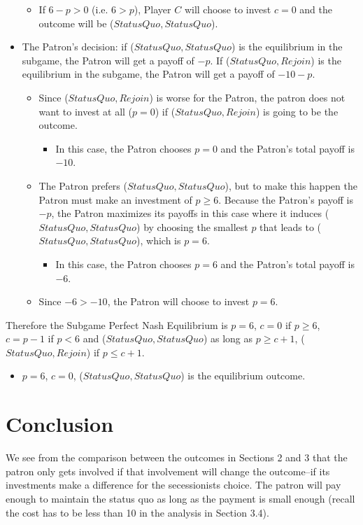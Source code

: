 \documentclass[12pt]{article}
\begin{document}
\begin{itemize}
\begin{itemize}
			\item If $6 - p > 0$ (i.e. $6 > p$), Player $C$ will choose to invest $c = 0$ and the outcome will be ($Status Quo,Status Quo$).
		\end{itemize}
	\item The Patron's decision: if ($Status Quo,Status Quo$) is the equilibrium in the subgame, the Patron will get a payoff of $-p$. If ($Status Quo,Rejoin$) is the equilibrium in the subgame, the Patron will get a payoff of $-10-p$.
		\begin{itemize}
			\item Since ($Status Quo,Rejoin$) is worse for the Patron, the patron does not want to invest at all ($p=0$) if ($Status Quo,Rejoin$) is going to be the outcome. 
				\begin{itemize}
					\item In this case, the Patron chooses $p=0$ and the Patron's total payoff is $-10$.
				\end{itemize}
			\item The Patron prefers ($Status Quo,Status Quo$), but to make this happen the Patron must make an investment of $p \geq 6$. Because the Patron's payoff is $-p$, the Patron maximizes its payoffs in this case where it induces ($Status Quo,Status Quo$) by choosing the smallest $p$ that leads to ($Status Quo,Status Quo$), which is $p=6$. 
				\begin{itemize}
					\item In this case, the Patron chooses $p=6$ and the Patron's total payoff is $-6$.
				\end{itemize}
			\item Since $-6 > -10$, the Patron will choose to invest $p=6$.
		\end{itemize}
\end{itemize}
Therefore the Subgame Perfect Nash Equilibrium is $p=6$, $c = 0$ if $p \geq 6$, $c = p-1$ if $p < 6$ and ($Status Quo,Status Quo$) as long as $p \geq c+1$, ($Status Quo,Rejoin$) if $p \leq c+ 1$.
\begin{itemize}
	\item $p=6$, $c = 0$, ($Status Quo,Status Quo$) is the equilibrium outcome.
\end{itemize}

\section{Conclusion}
We see from the comparison between the outcomes in Sections 2 and 3 that the patron only gets involved if that involvement will change the outcome--if its investments make a difference for the secessionists choice. The patron will pay enough to maintain the status quo as long as the payment is small enough (recall the cost has to be less than 10 in the analysis in Section 3.4). \\
\end{document}
